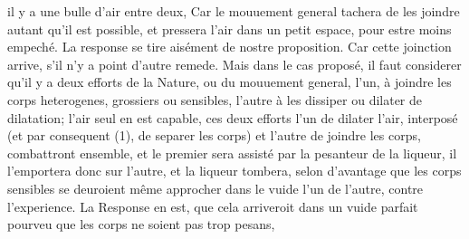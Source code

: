 \pstart {} il y a une bulle d'air entre deux,  Car le mouuement general tachera de les joindre autant qu'il est possible, et pressera l'air dans un petit espace, pour estre moins empech\'{e}. La response se tire ais\'{e}ment de nostre proposition. Car cette joinction arrive, s'il n'y a point d'autre remede. Mais dans le cas propos\'{e}, il faut considerer qu'il y a deux efforts de la Nature, ou du mouuement general, l'un, \`{a} joindre les corps heterogenes, grossiers ou sensibles, l'autre \`{a} les dissiper ou dilater  de dilatation;  l'air seul en est capable, ces deux efforts l'un de dilater l'air, interpos\'{e} (et par consequent (1), de separer les corps) et l'autre de joindre les corps, combattront ensemble, et le premier sera assist\'{e} par la pesanteur de la liqueur, il l'emportera donc sur l'autre, et la liqueur tombera, selon \pend \pstart {}  d'avantage que les corps sensibles\protect{} se deuroient même approcher dans le vuide\protect{} l'un de l'autre, contre l'experience. La Response en est, que cela arriveroit dans un vuide\protect{} parfait pourveu que les corps ne soient pas trop pesans,